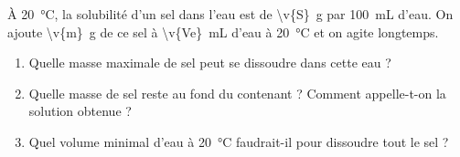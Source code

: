 À \qty{20}{\degreeCelsius}, la solubilité d'un sel dans l'eau est de \qty{\v{S}}{g} par \qty{100}{mL} d'eau. On ajoute \qty{\v{m}}{g} de ce sel à \qty{\v{Ve}}{mL} d'eau à \qty{20}{\degreeCelsius} et on agite longtemps.

\begin{enumerate}[label=\alph*)]
    \item Quelle masse maximale de sel peut se dissoudre dans cette eau ?
    \item Quelle masse de sel reste au fond du contenant ? Comment appelle-t-on la solution obtenue ?
    \item Quel volume minimal d'eau à \qty{20}{\degreeCelsius} faudrait-il pour dissoudre tout le sel ?
\end{enumerate}
